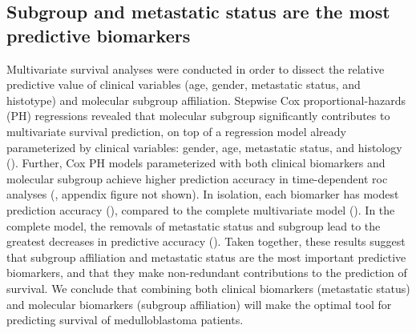 \clearpage

\subsection{Subgroup and metastatic status are the most predictive biomarkers}

Multivariate survival analyses were conducted in order to dissect the relative predictive value of clinical variables (age, gender, metastatic status, and histotype) and molecular subgroup affiliation. Stepwise Cox proportional-hazards (PH) regressions revealed that molecular subgroup significantly contributes to multivariate survival prediction, on top of a regression model already parameterized by clinical variables: gender, age, metastatic status, and histology (). Further, Cox PH models parameterized with both clinical biomarkers and molecular subgroup achieve higher prediction accuracy in time-dependent \gls{roc} analyses (, appendix figure not shown). In isolation, each biomarker has modest prediction accuracy (), compared to the complete multivariate model (). In the complete model, the removals of metastatic status and subgroup lead to the greatest decreases in predictive accuracy (). Taken together, these results suggest that subgroup affiliation and metastatic status are the most important predictive biomarkers, and that they make non-redundant contributions to the prediction of survival. We conclude that combining both clinical biomarkers (metastatic status) and molecular biomarkers (subgroup affiliation) will make the optimal tool for predicting survival of medulloblastoma patients.

